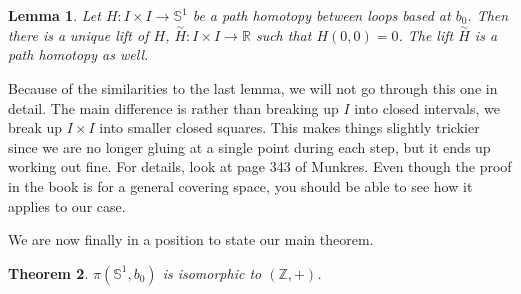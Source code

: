 \documentclass[a4paper]{article}
\newtheorem{theorem}{Theorem}
\newtheorem{lemma}[theorem]{Lemma}
\numberwithin{theorem}{section}
\begin{document}
\begin{lemma}
Let $H: I \times I \rightarrow \mathbb{S}^1$ be a path homotopy between loops based at $b_0$. Then there is a unique lift of $H$, $\overset{\sim}{H}: I \times I \rightarrow \mathbb{R}$ such that $H(0,0) = 0$. The lift $\overset{\sim}{H}$ is a path homotopy as well.
\end{lemma}

Because of the similarities to the last lemma, we will not go through this one in detail. The main difference is rather than breaking up $I$ into closed intervals, we break up $I \times I$ into smaller closed squares. This makes things slightly trickier since we are no longer gluing at a single point during each step, but it ends up working out fine. For details, look at page 343 of Munkres. Even though the proof in the book is for a general covering space, you should be able to see how it applies to our case.

We are now finally in a position to state our main theorem.

\begin{theorem}
$\pi(\mathbb{S}^1,b_0)$ is isomorphic to $(\mathbb{Z},+)$.
\end{theorem}
\end{document}
